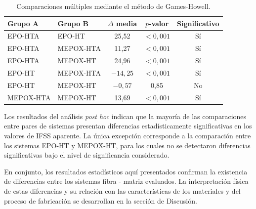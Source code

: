 \begin{table}[H]
    \centering
    \caption{Comparaciones múltiples mediante el método de Games-Howell.}
    \label{tab:games_howell}
    \begin{tabular}{l l c c c}
        \toprule
        Grupo A & Grupo B & $\Delta$ media & $p$-valor & Significativo \\
        \midrule
        EPO-HTA   & EPO-HT   & 25{,}52    & $< 0{,}001$ & Sí \\
        EPO-HTA   & MEPOX-HTA  & 11{,}27    & $< 0{,}001$ & Sí \\
        EPO-HTA   & MEPOX-HT & 24{,}96    & $< 0{,}001$ & Sí \\
        EPO-HT   & MEPOX-HTA  & $-14{,}25$ & $< 0{,}001$ & Sí \\
        EPO-HT   & MEPOX-HT & $-0{,}57$  & 0{,}85      & No \\
        MEPOX-HTA & MEPOX-HT & 13{,}69    & $< 0{,}001$ & Sí \\
        \bottomrule
    \end{tabular}
\end{table}

Los resultados del análisis \emph{post hoc} indican que la mayoría de las comparaciones entre
pares de sistemas presentan diferencias estadísticamente significativas en los valores de IFSS
aparente. La única excepción corresponde a la comparación entre los sistemas EPO-HT y
MEPOX-HT, para los cuales no se detectaron diferencias significativas bajo el nivel de
significancia considerado.

En conjunto, los resultados estadísticos aquí presentados confirman la existencia de diferencias entre los
sistemas fibra - matriz evaluados. La interpretación física de estas diferencias y su relación
con las características de los materiales y del proceso de fabricación se desarrollan en la
sección de Discusión.